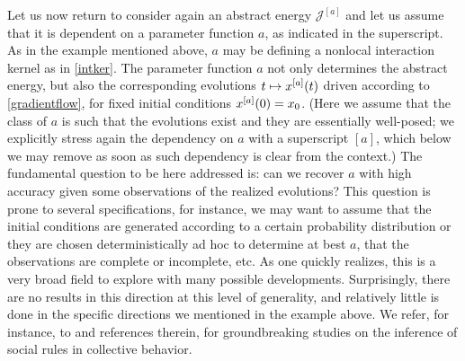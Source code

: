 Let us now return to consider again an abstract energy $\mathcal J^{[a]}$ and let us assume that it is dependent on a parameter function $a$, as indicated in the superscript. As in the example mentioned above, $a$ may be defining a nonlocal interaction kernel as in  \eqref{intker}. The parameter function $a$ not only determines the abstract energy, but also the corresponding evolutions  $t \mapsto x^{[a]}(t)$ driven according to \eqref{gradientflow}, for fixed initial conditions $x^{[a]}(0)=x_0$. (Here we assume that the class of $a$ is such that the evolutions exist and they are essentially well-posed; we explicitly stress again the dependency on $a$ with a superscript $[a]$, which below we may remove as soon as such dependency is clear from the context.)
The fundamental question to be here addressed is: can we recover $a$ with high accuracy given some observations of the realized evolutions? This question is prone to several specifications, for instance, we may want to assume that the initial conditions are generated according to a certain probability distribution or they are chosen deterministically ad hoc to determine at best $a$, that the observations are complete or incomplete, etc. As one  quickly realizes, this is a very broad field to explore with many possible developments. Surprisingly, there are no results in this direction at this level of generality, and relatively little is done in the specific directions we mentioned in the example above. We  refer, for instance,  to \cite{parisi08,parisi08-1,parisi08-2,Hildenbrandt01112010,mann11,heoemascszwa11} and references therein, for groundbreaking studies on the inference of social rules in collective behavior. 
